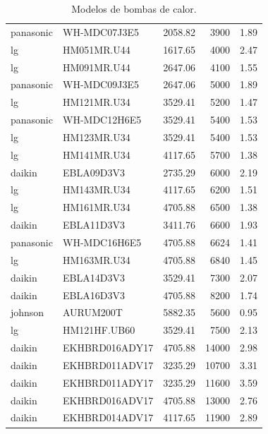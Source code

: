 \begin{table}[htbp]
\begin{tabular}{llrrr}
		panasonic  & WH-MDC07J3E5   & 2058.82                       & 3900           & 1.89      \\
		lg         & HM051MR.U44    & 1617.65                       & 4000           & 2.47      \\
		lg         & HM091MR.U44    & 2647.06                       & 4100           & 1.55      \\
		panasonic  & WH-MDC09J3E5   & 2647.06                       & 5000           & 1.89      \\
		lg         & HM121MR.U34    & 3529.41                       & 5200           & 1.47      \\
		panasonic  & WH-MDC12H6E5   & 3529.41                       & 5400           & 1.53      \\
		lg         & HM123MR.U34    & 3529.41                       & 5400           & 1.53      \\
		lg         & HM141MR.U34    & 4117.65                       & 5700           & 1.38      \\
		daikin     & EBLA09D3V3     & 2735.29                       & 6000           & 2.19      \\
		lg         & HM143MR.U34    & 4117.65                       & 6200           & 1.51      \\
		lg         & HM161MR.U34    & 4705.88                       & 6500           & 1.38      \\
		daikin     & EBLA11D3V3     & 3411.76                       & 6600           & 1.93      \\
		panasonic  & WH-MDC16H6E5   & 4705.88                       & 6624           & 1.41      \\
		lg         & HM163MR.U34    & 4705.88                       & 6840           & 1.45      \\
		daikin     & EBLA14D3V3     & 3529.41                       & 7300           & 2.07      \\
		daikin     & EBLA16D3V3     & 4705.88                       & 8200           & 1.74      \\
		johnson    & AURUM200T      & 5882.35                       & 5600           & 0.95      \\
		lg         & HM121HF.UB60   & 3529.41                       & 7500           & 2.13      \\
		daikin     & EKHBRD016ADY17 & 4705.88                       & 14000          & 2.98      \\
		daikin     & EKHBRD011ADV17 & 3235.29                       & 10700          & 3.31      \\
		daikin     & EKHBRD011ADY17 & 3235.29                       & 11600          & 3.59      \\
		daikin     & EKHBRD016ADV17 & 4705.88                       & 13000          & 2.76      \\
		daikin     & EKHBRD014ADV17 & 4117.65                       & 11900          & 2.89      \\
		\bottomrule
	\end{tabular}
	\caption{Modelos de bombas de calor.}
	\label{tab:heat_pump_data}
\end{table}


